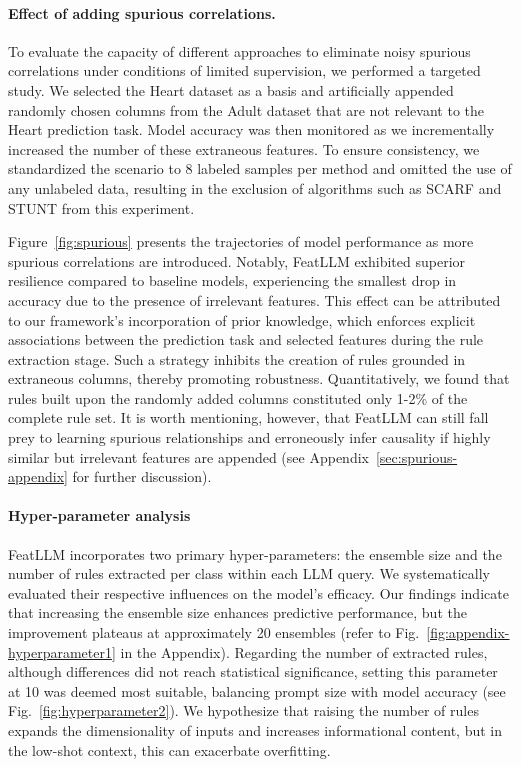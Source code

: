 \paragraph{Effect of adding spurious correlations.} To evaluate the capacity of different approaches to eliminate noisy spurious correlations under conditions of limited supervision, we performed a targeted study. We selected the Heart dataset as a basis and artificially appended randomly chosen columns from the Adult dataset that are not relevant to the Heart prediction task. Model accuracy was then monitored as we incrementally increased the number of these extraneous features. To ensure consistency, we standardized the scenario to 8 labeled samples per method and omitted the use of any unlabeled data, resulting in the exclusion of algorithms such as SCARF and STUNT from this experiment.

Figure~\ref{fig:spurious} presents the trajectories of model performance as more spurious correlations are introduced. Notably, \textsf{FeatLLM} exhibited superior resilience compared to baseline models, experiencing the smallest drop in accuracy due to the presence of irrelevant features. This effect can be attributed to our framework’s incorporation of prior knowledge, which enforces explicit associations between the prediction task and selected features during the rule extraction stage. Such a strategy inhibits the creation of rules grounded in extraneous columns, thereby promoting robustness. Quantitatively, we found that rules built upon the randomly added columns constituted only 1-2\% of the complete rule set. It is worth mentioning, however, that \textsf{FeatLLM} can still fall prey to learning spurious relationships and erroneously infer causality if highly similar but irrelevant features are appended (see Appendix~\ref{sec:spurious-appendix} for further discussion).

\vspace*{-0.12in}
\paragraph{Hyper-parameter analysis}
\textsf{FeatLLM} incorporates two primary hyper-parameters: the ensemble size and the number of rules extracted per class within each LLM query. We systematically evaluated their respective influences on the model’s efficacy. Our findings indicate that increasing the ensemble size enhances predictive performance, but the improvement plateaus at approximately 20 ensembles (refer to Fig.~\ref{fig:appendix-hyperparameter1} in the Appendix). Regarding the number of extracted rules, although differences did not reach statistical significance, setting this parameter at 10 was deemed most suitable, balancing prompt size with model accuracy (see Fig.~\ref{fig:hyperparameter2}). We hypothesize that raising the number of rules expands the dimensionality of inputs and increases informational content, but in the low-shot context, this can exacerbate overfitting.

